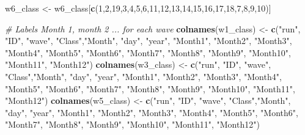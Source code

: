 \documentclass[
]{book}
\newenvironment{Shaded}{\begin{snugshade}}{\end{snugshade}}
\newcommand{\CommentTok}[1]{\textcolor[rgb]{0.56,0.35,0.01}{\textit{#1}}}
\newcommand{\DecValTok}[1]{\textcolor[rgb]{0.00,0.00,0.81}{#1}}
\newcommand{\KeywordTok}[1]{\textcolor[rgb]{0.13,0.29,0.53}{\textbf{#1}}}
\newcommand{\NormalTok}[1]{#1}
\newcommand{\StringTok}[1]{\textcolor[rgb]{0.31,0.60,0.02}{#1}}
\begin{document}
\begin{Shaded}
\begin{Highlighting}[]
\NormalTok{w6_class <-}\StringTok{ }\NormalTok{w6_class[}\KeywordTok{c}\NormalTok{(}\DecValTok{1}\NormalTok{,}\DecValTok{2}\NormalTok{,}\DecValTok{19}\NormalTok{,}\DecValTok{3}\NormalTok{,}\DecValTok{4}\NormalTok{,}\DecValTok{5}\NormalTok{,}\DecValTok{6}\NormalTok{,}\DecValTok{11}\NormalTok{,}\DecValTok{12}\NormalTok{,}\DecValTok{13}\NormalTok{,}\DecValTok{14}\NormalTok{,}\DecValTok{15}\NormalTok{,}\DecValTok{16}\NormalTok{,}\DecValTok{17}\NormalTok{,}\DecValTok{18}\NormalTok{,}\DecValTok{7}\NormalTok{,}\DecValTok{8}\NormalTok{,}\DecValTok{9}\NormalTok{,}\DecValTok{10}\NormalTok{)]}

\CommentTok{# Labels Month 1, month 2 ... for each wave}
\KeywordTok{colnames}\NormalTok{(w1_class) <-}\StringTok{ }\KeywordTok{c}\NormalTok{(}\StringTok{"run"}\NormalTok{, }\StringTok{"ID"}\NormalTok{, }\StringTok{"wave"}\NormalTok{, }\StringTok{"Class"}\NormalTok{,}\StringTok{"Month"}\NormalTok{, }\StringTok{"day"}\NormalTok{, }\StringTok{"year"}\NormalTok{, }\StringTok{"Month1"}\NormalTok{, }\StringTok{"Month2"}\NormalTok{, }\StringTok{"Month3"}\NormalTok{, }\StringTok{"Month4"}\NormalTok{, }\StringTok{"Month5"}\NormalTok{, }\StringTok{"Month6"}\NormalTok{, }\StringTok{"Month7"}\NormalTok{, }\StringTok{"Month8"}\NormalTok{, }\StringTok{"Month9"}\NormalTok{, }\StringTok{"Month10"}\NormalTok{, }\StringTok{"Month11"}\NormalTok{, }\StringTok{"Month12"}\NormalTok{)}
\KeywordTok{colnames}\NormalTok{(w3_class) <-}\StringTok{ }\KeywordTok{c}\NormalTok{(}\StringTok{"run"}\NormalTok{, }\StringTok{"ID"}\NormalTok{, }\StringTok{"wave"}\NormalTok{, }\StringTok{"Class"}\NormalTok{,}\StringTok{"Month"}\NormalTok{, }\StringTok{"day"}\NormalTok{, }\StringTok{"year"}\NormalTok{, }\StringTok{"Month1"}\NormalTok{, }\StringTok{"Month2"}\NormalTok{, }\StringTok{"Month3"}\NormalTok{, }\StringTok{"Month4"}\NormalTok{, }\StringTok{"Month5"}\NormalTok{, }\StringTok{"Month6"}\NormalTok{, }\StringTok{"Month7"}\NormalTok{, }\StringTok{"Month8"}\NormalTok{, }\StringTok{"Month9"}\NormalTok{, }\StringTok{"Month10"}\NormalTok{, }\StringTok{"Month11"}\NormalTok{, }\StringTok{"Month12"}\NormalTok{)}
\KeywordTok{colnames}\NormalTok{(w5_class) <-}\StringTok{ }\KeywordTok{c}\NormalTok{(}\StringTok{"run"}\NormalTok{, }\StringTok{"ID"}\NormalTok{, }\StringTok{"wave"}\NormalTok{, }\StringTok{"Class"}\NormalTok{,}\StringTok{"Month"}\NormalTok{, }\StringTok{"day"}\NormalTok{, }\StringTok{"year"}\NormalTok{, }\StringTok{"Month1"}\NormalTok{, }\StringTok{"Month2"}\NormalTok{, }\StringTok{"Month3"}\NormalTok{, }\StringTok{"Month4"}\NormalTok{, }\StringTok{"Month5"}\NormalTok{, }\StringTok{"Month6"}\NormalTok{, }\StringTok{"Month7"}\NormalTok{, }\StringTok{"Month8"}\NormalTok{, }\StringTok{"Month9"}\NormalTok{, }\StringTok{"Month10"}\NormalTok{, }\StringTok{"Month11"}\NormalTok{, }\StringTok{"Month12"}\NormalTok{)}

\end{Highlighting}
\end{Shaded}
\end{document}
